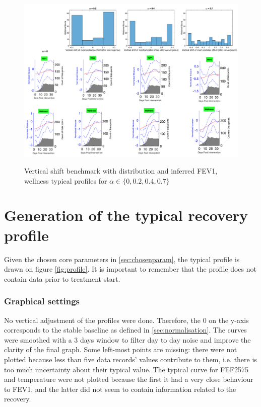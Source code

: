 \begin{figure}[!h]
    \caption{Vertical shift benchmark with distribution and inferred FEV1, wellness typical profiles for $\alpha \in \{0, 0.2, 0.4, 0.7\}$ }
    \centering
    \includegraphics[width=140mm]{images/vshift.png}
    \label{fig:vshift}
\end{figure} 

\section{Generation of the typical recovery profile}
Given the chosen core parameters in \ref{sec:chosenparam}, the typical profile is drawn on figure \ref{fig:profile}. It is important to remember that the profile does not contain data prior to treatment start. 
\subsubsection{Graphical settings}
No vertical adjustment of the profiles were done. Therefore, the 0 on the y-axis corresponds to the stable baseline as defined in \ref{sec:normalisation}. The curves were smoothed with a 3 days window to filter day to day noise and improve the clarity of the final graph. Some left-most points are missing: there were not plotted because less than five data records' values contribute to them, i.e. there is too much uncertainty about their typical value. The typical curve for FEF2575 and temperature were not plotted because the first it had a very close behaviour to FEV1, and the latter did not seem to contain information related to the recovery.

